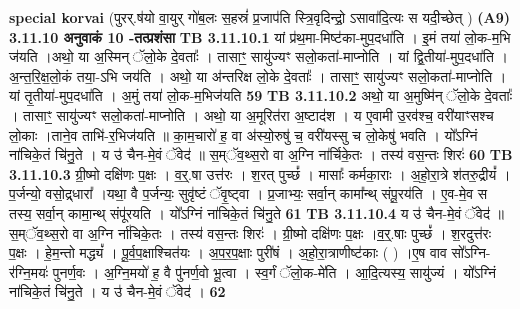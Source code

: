 \documentclass[17pt]{extarticle}
\begin{document}
{{{{{{{{{{{{{{{{{{{{{{                  \newline
                                                        \textbf{special korvai} \newline
              (पुरर्.ष॑यो वा॒युर् गो॑ब॒लः स॒हस्रं॑ प्र॒जाप॑ति स्त्रि॒वृदिन्द्रो॒ ऽसावा॑दि॒त्यः स यदी॒च्छेत् ) \newline
                                [समृ॑द्ध॒ - ऋद्धि॑कामः - प॒रस्ता᳚च् - चिक्ये - पु॒त्रो॑ - ऽगच्छ - दि॒च्छे - ज्जु॑हुयाद् - विश्व॒प्रिः ( ) ] \textbf{(A9)} \newline \newline
                \textbf{ 3.11.10   अनुवाकं   10 -तत्प्रशंसा} \newline
                                \textbf{ TB 3.11.10.1} \newline
                  यां प्र॑थ॒मा-मिष्ट॑का-मुप॒दधा॑ति । इ॒मं तया॑ लो॒क-म॒भि ज॑यति ।अथो॒ या अ॒स्मिन् ॅलो॒के दे॒वताः᳚ । तासाꣳ॒॒ सायु॑ज्यꣳ सलो॒कता॑-माप्नोति । यां द्वि॒तीया॑-मुप॒दधा॑ति । अ॒न्त॒रि॒क्ष॒लो॒कं तया॒-ऽभि जय॑ति । अथो॒ या अ॑न्तरिक्ष लो॒के दे॒वताः᳚ । तासाꣳ॒॒ सायु॑ज्यꣳ सलो॒कता॑-माप्नोति । यां तृ॒तीया॑-मुप॒दधा॑ति । अ॒मुं तया॑ लो॒क-म॒भिज॑यति \textbf{ 59} \newline
                  \newline
                                \textbf{ TB 3.11.10.2} \newline
                  अथो॒ या अ॒मुष्मि॑न् ॅलो॒के दे॒वताः᳚ । तासाꣳ॒॒ सायु॑ज्यꣳ सलो॒कता॑-माप्नोति । अथो॒ या अ॒मूरित॑रा अ॒ष्टाद॑श । य ए॒वामी उ॒रव॑श्च॒ वरी॑याꣳसश्च लो॒काः ।ताने॒व ताभि॑-र॒भिज॑यति ॥ का॒म॒चारो॑ ह॒ वा अ॑स्यो॒रुषु॑ च॒ वरी॑यस्सु च लो॒केषु॑ भवति । यो᳚ऽग्निं ना॑चिके॒तं चि॑नु॒ते । य उ॑ चैन-मे॒वं ॅवेद॑ ॥ स॒म्ॅव॒थ्स॒रो वा अ॒ग्नि ना॑र्चिके॒तः । तस्य॑ वस॒न्तः शिरः॑ \textbf{ 60} \newline
                  \newline
                                \textbf{ TB 3.11.10.3} \newline
                  ग्री॒ष्मो दक्षि॑णः प॒क्षः । व॒र्॒.षा उत्त॑रः । श॒रत् पुच्छं᳚ । मासाः᳚ कर्मका॒राः । अ॒हो॒रा॒त्रे श॑तरु॒द्रीयं᳚ । प॒र्जन्यो॒ वसो॒द्र्धारा᳚ ।यथा॒ वै प॒र्जन्यः॒ सुवृ॑ष्टं ॅवृ॒ष्ट्वा । प्र॒जाभ्यः॒ सर्वा॒न् कामा᳚न्थ् संपू॒रय॑ति । ए॒व-मे॒व स तस्य॒ सर्वा॒न् कामा॒न्थ् संपू॑रयति । यो᳚ऽग्निं ना॑चिके॒तं चि॑नु॒ते \textbf{ 61} \newline
                  \newline
                                \textbf{ TB 3.11.10.4} \newline
                  य उ॑ चैन-मे॒वं ॅवेद॑ ॥ स॒म्ॅव॒थ्स॒रो वा अ॒ग्नि र्ना॑चिके॒तः । तस्य॑ वस॒न्तः शिरः॑ । ग्री॒ष्मो दक्षि॑णः प॒क्षः ।व॒॒र्॒.षाः पुच्छं᳚ । श॒रदुत्त॑रः प॒क्षः । हे॒म॒न्तो मद्ध्यं᳚ । पू॒र्व॒प॒क्षाश्चित॑यः । अ॒प॒र॒प॒क्षाः पुरी॑षं । अ॒हो॒रा॒त्राणीष्ट॑काः ( ) ।ए॒ष वाव सो᳚ऽग्नि-र॑ग्नि॒मयः॑ पुनर्ण॒वः । अ॒ग्नि॒मयो॑ ह॒ वै पु॑नर्ण॒वो भू॒त्वा । स्व॒र्गं ॅलो॒क-मे॑ति । आ॒दि॒त्यस्य॒ सायु॑ज्यं । यो᳚ऽग्निं ना॑चिके॒तं चि॑नु॒ते । य उ॑ चैन-मे॒वं ॅवेद॑ । \textbf{ 62} \newline
}}}}}}}}}}}}}}}}}}}}}}
\end{document}
